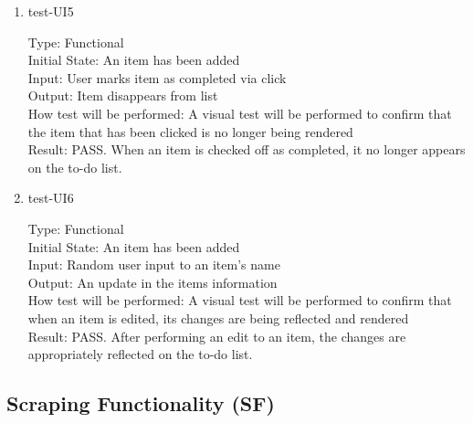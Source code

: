 \documentclass[12pt, titlepage]{article}
\begin{document}
\begin{enumerate}
\item{test-UI5\\}

Type: Functional\\
Initial State: An item has been added\\
Input: User marks item as completed via click\\
Output: Item disappears from list\\
How test will be performed: A visual test will be performed to confirm that the item that has been clicked is no longer being rendered\\
Result: PASS. When an item is checked off as completed, it no longer appears on the to-do list.

\item{test-UI6}

Type: Functional\\
Initial State: An item has been added\\
Input: Random user input to an item’s name\\
Output: An update in the items information\\
How test will be performed: A visual test will be performed to confirm that when an item is edited, its changes are being reflected and rendered\\
Result: PASS. After performing an edit to an item, the changes are appropriately reflected on the to-do list. 

\end{enumerate}

\subsection{Scraping Functionality (SF)}
\end{document}
